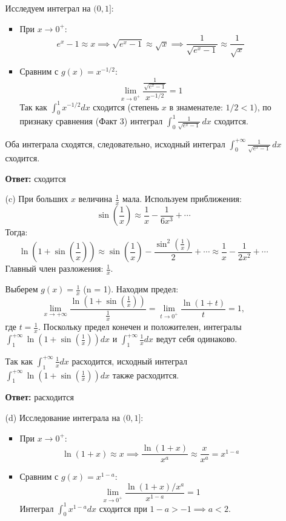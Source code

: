 \documentclass[a4paper]{article}
\begin{document}
\begin{enumerate}
\begin{enumerate}
    Исследуем интеграл на \((0, 1]\):
    \begin{itemize}
      \item При \(x \to 0^+\):  
     \[
     e^x - 1 \approx x \implies \sqrt{e^x - 1} \approx 
     \sqrt{x} \implies \frac{1}{\sqrt{e^x - 1}} \approx \frac{1}{\sqrt{x}}
     \]  
     \item Сравним с \(g(x) = x^{-1/2}\):  
     \[
     \lim_{x \to 0^+} \frac{\frac{1}{\sqrt{e^x - 1}}}{x^{-1/2}} = 1
     \]  
     Так как \(\int_{0}^{1} x^{-1/2} dx\) сходится (степень \(x\) в знаменателе: 
     \(1/2 < 1\)), по признаку сравнения (Факт 3) интеграл 
     \(\int_{0}^{1} \frac{1}{\sqrt{e^x - 1}} \, dx\) сходится.
    \end{itemize}
    Оба интеграла сходятся, следовательно, исходный интеграл \(\int_{0}^{+\infty} \frac{1}{\sqrt{e^x - 1}} \, dx\) сходится.
    
    \textbf{Ответ: } сходится\\

    \item[(c)]При больших \(x\) величина \(\frac{1}{x}\) мала. Используем приближения:  
    \[
    \sin\left(\frac{1}{x}\right) \approx \frac{1}{x} - \frac{1}{6x^3} + \cdots
    \]  
    Тогда:  
    \[
    \ln\left(1 + \sin\left(\frac{1}{x}\right)\right) \approx
      \sin\left(\frac{1}{x}\right) - \frac{\sin^2\left(\frac{1}{x}\right)}{2} + 
      \cdots \approx \frac{1}{x} - \frac{1}{2x^2} + \cdots
    \]  
    Главный член разложения: \(\frac{1}{x}\).

    Выберем \(g(x) = \frac{1}{x}\) (n = 1). Находим предел:  
    \[
    \lim_{x \to +\infty} \frac{\ln\left(1 + \sin\left(\frac{1}{x}\right)\right)}{\frac{1}{x}} = \lim_{t \to 0^+} \frac{\ln(1 + t)}{t} = 1,
    \]  
    где \(t = \frac{1}{x}\). 
    Поскольку предел конечен и положителен, интегралы 
    \(\int_{1}^{+\infty} \ln\left(1 + \sin\left(\frac{1}{x}\right) \right)dx\) и 
    \(\int_{1}^{+\infty} \frac{1}{x} dx\) ведут себя одинаково.

    Так как \(\int_{1}^{+\infty} \frac{1}{x} dx\) 
    расходится, исходный интеграл \(\int_{1}^{+\infty}
    \ln\left(1 + \sin\left(\frac{1}{x}\right) \right) dx\) также расходится.

    \textbf{Ответ: } расходится\\

    \item[(d)]Исследование интеграла на \((0, 1]\):
    \begin{itemize}
      \item При \(x \to 0^+\):  
      \[
      \ln(1+x) \approx x \implies \frac{\ln(1+x)}{x^a} \approx \frac{x}{x^a} = x^{1 - a}
      \]  
      \item Сравним с \(g(x) = x^{1 - a}\):  
     \[
     \lim_{x \to 0^+} \frac{\ln(1+x)/x^a}{x^{1 - a}} = 1
     \]  
     Интеграл \(\int_{0}^{1} x^{1 - a} dx\) сходится при \(1 - a > -1 \implies a < 2\).


\end{itemize}
\end{enumerate}
\end{enumerate}
\end{document}
